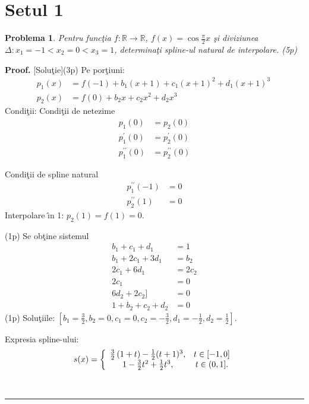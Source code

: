 \documentclass{article}%
\newtheorem{problem}[theorem]{Problema}
\newenvironment{proof}[1][Proof]{\noindent\textbf{#1.} }{\ \rule{0.5em}{0.5em}}
\begin{document}
\section*{Setul 1}

\begin{problem}
Pentru func\c{t}ia $f:\mathbb{R\rightarrow R}$, $f(x)=\cos\frac{\pi}{2}x$
\c{s}i diviziunea $\Delta:x_{1}=-1<x_{2}=0<x_{3}=1$, determina\c{t}i spline-ul
natural de interpolare. (5p)
\end{problem}

\begin{proof}
[Solu\c{t}ie](3p) Pe por\c{t}iuni:
\begin{align*}
p_{1}(x) &  =f(-1)+b_{1}(x+1)+c_{1}(x+1)^{2}+d_{1}(x+1)^{3}~\\
p_{2}(x) &  =f(0)+b_{2}x+c_{2}x^{2}+d_{2}x^{3}%
\end{align*}
Condi\c{t}ii: Condi\c{t}ii de netezime%
\begin{align*}
p_{1}(0) &  =p_{2}(0)\\
p_{1}^{\prime}(0) &  =p_{2}^{\prime}(0)\\
p_{1}^{\prime\prime}(0) &  =p_{2}^{\prime\prime}(0)
\end{align*}


Condi\c{t}ii de spline natural%
\begin{align*}
p_{1}^{\prime\prime}(-1)  &  =0\\
p_{2}^{\prime\prime}(1)  &  =0
\end{align*}
Interpolare \^{\i}n 1: $p_{2}(1)=f(1)=0$. 

(1p) Se ob\c{t}ine sistemul%
\begin{align*}
b_{1}+c_{1}+d_{1}  &  =1\\
b_{1}+2c_{1}+3d_{1}  &  =b_{2}\\
2c_{1}+6d_{1}  &  =2c_{2}\\
2c_{1}  &  =0\\
6d_{2}+2c_{2}]  &  =0\\
1+b_{2}+c_{2}+d_{2}  &  =0
\end{align*}
(1p) Solu\c{t}iile: $\left[  b_{1}=\frac{3}{2},b_{2}=0,c_{1}=0,c_{2}=-\frac
{3}{2},d_{1}=-\frac{1}{2},d_{2}=\frac{1}{2}\right]$. 

Expresia spline-ului:%
\[
s(x)=\left\{
\begin{array}
[c]{cc}%
\frac{3}{2}\left(  1+t\right)  -\frac{1}{2}(t+1)^{3}, & t\in\lbrack-1,0]\\
1-\frac{3}{2}t^{2}+\frac{1}{2}t^{3}, & t\in(0,1].
\end{array}
\right.
\]

\end{proof}
\end{document}
